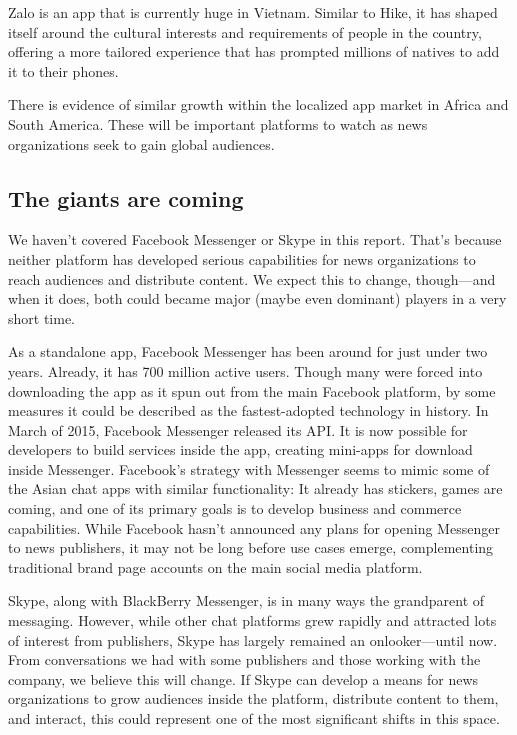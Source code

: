 \documentclass[notoc, symmetric, nobib, nols]{towcenter-guideto-book}
\begin{document}
Zalo is an app that is currently huge in Vietnam. Similar to Hike, it has shaped itself around the cultural interests and requirements of people in the country, offering a more tailored experience that has prompted millions of natives to add it to their phones.

There is evidence of similar growth within the localized app market in Africa and South America. These will be important platforms to watch as news organizations seek to gain global audiences.


\subsection{The giants are coming}
We haven't covered Facebook Messenger or Skype in this report. That's because neither platform has developed serious capabilities for news organizations to reach audiences and distribute content. We expect this to change, though---and when it does, both could became major (maybe even dominant) players in a very short time.

As a standalone app, Facebook Messenger has been around for just under two years. Already, it has 700 million active users. Though many were forced into downloading the app as it spun out from the main Facebook platform, by some measures it could be described as the fastest-adopted technology in history. In March of 2015, Facebook Messenger released its API.\autocite{FacebookMessenger} It is now possible for developers to build services inside the app, creating mini-apps for download inside Messenger. Facebook's strategy with Messenger seems to mimic some of the Asian chat apps with similar functionality: It already has stickers, games are coming, and one of its primary goals is to develop business and commerce capabilities. While Facebook hasn't announced any plans for opening Messenger to news publishers, it may not be long before use cases emerge, complementing traditional brand page accounts on the main social media platform. 

Skype, along with BlackBerry Messenger, is in many ways the grandparent of messaging. However, while other chat platforms grew rapidly and attracted lots of interest from publishers, Skype has largely remained an onlooker---until now. From conversations we had with some publishers and those working with the company, we believe this will change. If Skype can develop a means for news organizations to grow audiences inside the platform, distribute content to them, and interact, this could represent one of the most significant shifts in this space. 
\end{document}
